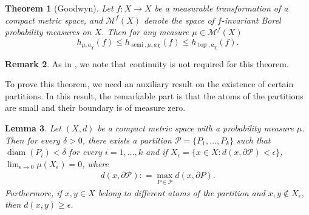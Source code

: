\documentclass[oneside]{amsart}
\theoremstyle{plain}
\newtheorem{THM}{Theorem}[section]
\newtheorem{LEM}[THM]{Lemma}
\theoremstyle{definition}
\newtheorem{RMK}[THM]{Remark}
\newcommand{\dfn}{\mathrel{\mathop:}=}
\newcommand{\<}{\langle}
\renewcommand{\>}{\rangle}
\renewcommand{\P}{\mathcal{P}}
\newcommand{\e}{\epsilon}
\renewcommand{\|}{|\!|} %
\newcommand{\semitop}{\operatorname{semi}} %
\begin{document}
\begin{THM}[Goodwyn] 
\label{thm:SlowVariationalPrinciple}
    Let $f \colon X \to X$ be a measurable transformation of a compact metric space, and $\mathcal M^f(X)$ denote the space of $f$-invariant Borel probability measures on $X$. Then for any measure $\mu \in \mathcal M^f(X)$
\begin{equation}
    h_{\mu,a_\chi}(f) \le h_{\semitop,\mu,a\chi}(f) \le h_{\operatorname{top},a_\chi}(f).
    \label{eq:SlowGoodwyn}
\end{equation}

\end{THM}

\begin{RMK}
    As in , we note that continuity is not required for this theorem.
\end{RMK}

To prove this theorem, we need an auxiliary result on the existence of certain partitions. In this result, the remarkable part is that the atoms of the partitions are small and their boundary is of measure zero. 


\begin{LEM}
    Let $(X,d)$ be a compact metric space with a probability measure $\mu$. Then for every $\delta > 0$, there exists a partition $\P = \{P_1,\dots,P_k\}$ such that $\operatorname{diam}(P_i) < \delta$ for every $i = 1,\dots,k$ and if $X_\e = \{ x \in X : d(x,\partial \P) < \epsilon\}$, $\lim_{\e \to 0} \mu(X_\epsilon) = 0$, where 
    \begin{align*}
        d(x,\partial \P)\dfn \max _{P \in \P} d (x,\partial P).
    \end{align*}
    Furthermore, if $x,y \in X$ belong to different atoms of the partition and $x,y \not\in X_\epsilon$, then $d(x,y) \ge \epsilon$.
    \label{lemma:SpecialPartition}
\end{LEM}
\end{document}
